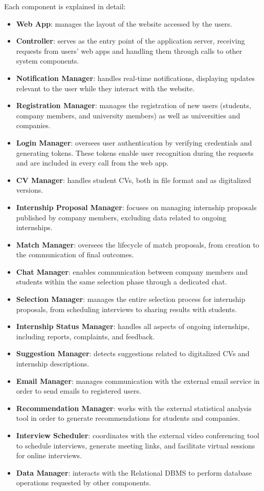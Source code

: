 \noindent
Each component is explained in detail:
\begin{itemize}
    \item \textbf{Web App}: manages the layout of the website accessed by the users.
    \item \textbf{Controller}: serves as the entry point of the application server, receiving requests from users' web apps and handling them through calls to other system components.
    \item \textbf{Notification Manager}: handles real-time notifications, displaying updates relevant to the user while they interact with the website.
    \item \textbf{Registration Manager}: manages the registration of new users (students, company members, and university members) as well as universities and companies.
    \item \textbf{Login Manager}: oversees user authentication by verifying credentials and generating tokens. These tokens enable user recognition during the requests and are included in every call from the web app.
    \item \textbf{CV Manager}: handles student CVs, both in file format and as digitalized versions.
    \item \textbf{Internship Proposal Manager}: focuses on managing internship proposals published by company members, excluding data related to ongoing internships.
    \item \textbf{Match Manager}: oversees the lifecycle of match proposals, from creation to the communication of final outcomes.
    \item \textbf{Chat Manager}: enables communication between company members and students within the same selection phase through a dedicated chat.
    \item \textbf{Selection Manager}: manages the entire selection process for internship proposals, from scheduling interviews to sharing results with students.
    \item \textbf{Internship Status Manager}: handles all aspects of ongoing internships, including reports, complaints, and feedback.
    \item \textbf{Suggestion Manager}: detects suggestions related to digitalized CVs and internship descriptions.
    \item \textbf{Email Manager}: manages communication with the external email service in order to send emails to registered users.
    \item \textbf{Recommendation Manager}: works with the external statistical analysis tool in order to generate recommendations for students and companies.
    \item \textbf{Interview Scheduler}: coordinates with the external video conferencing tool to schedule interviews, generate meeting links, and facilitate virtual sessions for online interviews.
    \item \textbf{Data Manager}: interacts with the Relational DBMS to perform database operations requested by other components.
\end{itemize}
\newpage
